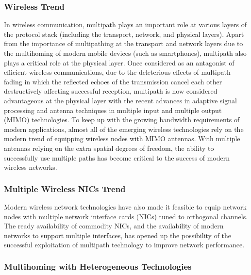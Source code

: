 \documentclass[10pt]{IEEEtran}
\begin{document}
\subsubsection{Wireless Trend} In wireless communication, multipath plays an important role at various layers of the protocol stack (including the transport, network, and physical layers). Apart from the importance of multipathing at the transport and network layers due to the multihoming of modern mobile devices (such as smartphones), multipath also plays a critical role at the physical layer. Once considered as an antagonist of efficient wireless communications, due to the deleterious effects of multipath fading in which the reflected echoes of the transmission cancel each other destructively affecting successful reception, multipath is now considered advantageous at the physical layer with the recent advances in adaptive signal processing and antenna techniques in multiple input and multiple output (MIMO) technologies. To keep up with the growing bandwidth requirements of modern applications, almost all of the emerging wireless technologies rely on the modern trend of equipping wireless nodes with MIMO antennas. With multiple antennas relying on the extra spatial degrees of freedom, the ability to successfully use multiple paths has become critical to the success of modern wireless networks.

\vspace{1mm}
\subsubsection{Multiple Wireless NICs Trend} Modern wireless network technologies have also made it feasible to equip network nodes with multiple network interface cards (NICs) tuned to orthogonal channels. The ready availability of commodity NICs, and the availability of modern networks to support multiple interfaces, has opened up the possibility of the successful exploitation of multipath technology to improve network performance.

\vspace{1mm}
\subsubsection{Multihoming with Heterogeneous Technologies} 
\end{document}
